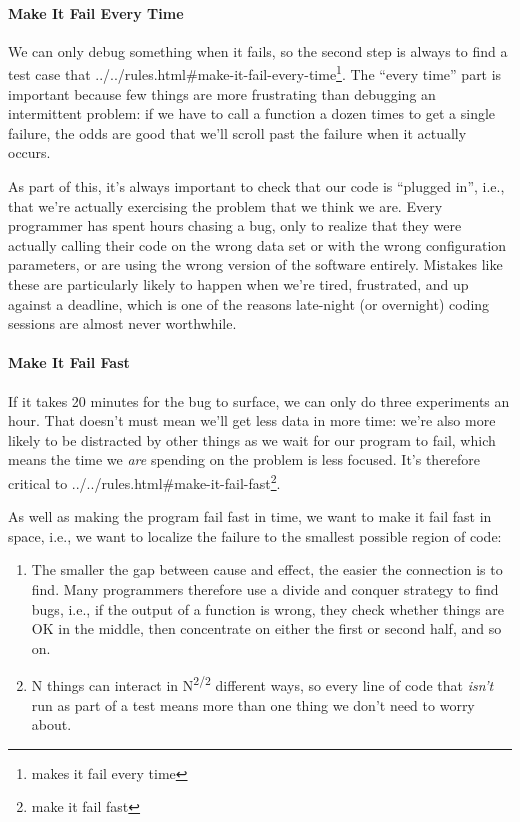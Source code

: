 \documentclass[]{book}
\newcommand{\urlfoot}[2]{{#1}\footnote{#2}}
\begin{document}
\mbox{}\paragraph{Make It Fail Every Time}

We can only debug something when it fails, so the second step is always
to find a test case that
\urlfoot{../../rules.html\#make-it-fail-every-time}{makes it fail every
time}. The ``every time'' part is important because few things are more
frustrating than debugging an intermittent problem: if we have to call a
function a dozen times to get a single failure, the odds are good that
we'll scroll past the failure when it actually occurs.

As part of this, it's always important to check that our code is
``plugged in'', i.e., that we're actually exercising the problem that we
think we are. Every programmer has spent hours chasing a bug, only to
realize that they were actually calling their code on the wrong data set
or with the wrong configuration parameters, or are using the wrong
version of the software entirely. Mistakes like these are particularly
likely to happen when we're tired, frustrated, and up against a
deadline, which is one of the reasons late-night (or overnight) coding
sessions are almost never worthwhile.

\mbox{}\paragraph{Make It Fail Fast}

If it takes 20 minutes for the bug to surface, we can only do three
experiments an hour. That doesn't must mean we'll get less data in more
time: we're also more likely to be distracted by other things as we wait
for our program to fail, which means the time we \emph{are} spending on
the problem is less focused. It's therefore critical to
\urlfoot{../../rules.html\#make-it-fail-fast}{make it fail fast}.

As well as making the program fail fast in time, we want to make it fail
fast in space, i.e., we want to localize the failure to the smallest
possible region of code:

\begin{enumerate}
\item
  The smaller the gap between cause and effect, the easier the
  connection is to find. Many programmers therefore use a divide and
  conquer strategy to find bugs, i.e., if the output of a function is
  wrong, they check whether things are OK in the middle, then
  concentrate on either the first or second half, and so on.
\item
  N things can interact in N\textsuperscript{2/2} different ways, so
  every line of code that \emph{isn't} run as part of a test means more
  than one thing we don't need to worry about.
\end{enumerate}
\end{document}
